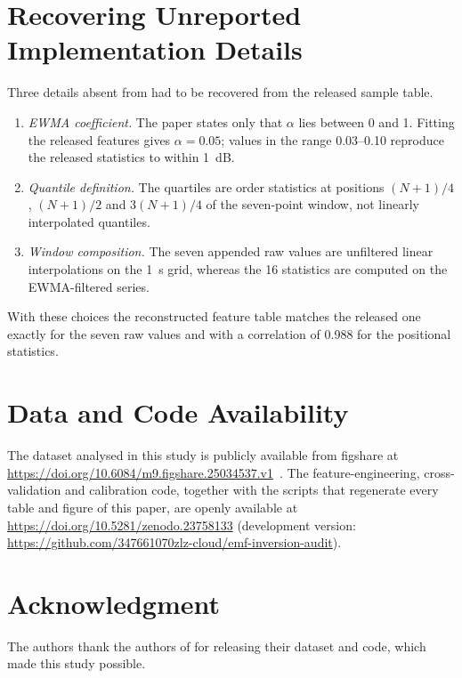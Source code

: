 \documentclass{ieeeaccess}
\begin{document}
\appendices
\section{Recovering Unreported Implementation Details}
\label{app:details}
Three details absent from \cite{zeng2024} had to be recovered from the released
sample table.
\begin{enumerate}
\item \emph{EWMA coefficient.} The paper states only that $\alpha$ lies between 0
and 1. Fitting the released features gives $\alpha=0.05$; values in the range
0.03--0.10 reproduce the released statistics to within 1~dB.
\item \emph{Quantile definition.} The quartiles are order statistics at positions
$(N+1)/4$, $(N+1)/2$ and $3(N+1)/4$ of the seven-point window, not linearly
interpolated quantiles.
\item \emph{Window composition.} The seven appended raw values are unfiltered
linear interpolations on the 1~s grid, whereas the 16 statistics are computed on
the EWMA-filtered series.
\end{enumerate}
With these choices the reconstructed feature table matches the released one
exactly for the seven raw values and with a correlation of 0.988 for the
positional statistics.

\section*{Data and Code Availability}
The dataset analysed in this study is publicly available from figshare at
\url{https://doi.org/10.6084/m9.figshare.25034537.v1}~\cite{zeng2024}. The
feature-engineering, cross-validation and calibration code, together with the
scripts that regenerate every table and figure of this paper, are openly
available at \url{https://doi.org/10.5281/zenodo.23758133} (development version:
\url{https://github.com/347661070zlz-cloud/emf-inversion-audit}).

\section*{Acknowledgment}
The authors thank the authors of \cite{zeng2024} for releasing their dataset and
code, which made this study possible.
\end{document}
